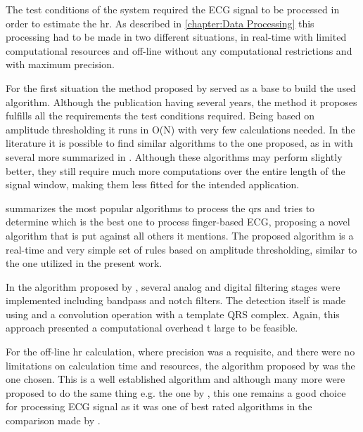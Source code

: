 The test conditions of the system required the ECG signal to be processed in order to estimate the \ac{hr}. As described in \cref{chapter:Data Processing} this processing had to be made in two different situations, in real-time with limited computational resources and off-line without any computational restrictions and with maximum precision.

For the first situation the method proposed by \citet{segmenter} served as a base to build the used algorithm. Although the publication having several years, the method it proposes fulfills all the requirements the test conditions required. Being based on amplitude thresholding it runs in O(N) \cite{big_o} with very few calculations needed. In the literature it is possible to find similar algorithms to the one proposed, as in \citet{b_segmenter, b_segmenter_2, b_segmenter_3} with several more summarized in \citet{b_segmenter_revisiting}. Although these algorithms may perform slightly better, they still require much more computations over the entire length of the signal window, making them less fitted for the intended application.

\citet{b_segmenter} summarizes the most popular algorithms to process the \ac{qrs} and tries to determine which is the best one to process finger-based ECG, proposing a novel algorithm that is put against all others it mentions. The proposed algorithm is a real-time and very simple set of rules based on amplitude thresholding, similar to the one utilized in the present work.

In the algorithm proposed by \citet{b_segmenter_2}, several analog and digital filtering stages were implemented including bandpass and notch filters. The detection itself is made using and a convolution operation with a template QRS complex. Again, this approach presented a computational overhead t large to be feasible.

For the off-line \ac{hr} calculation, where precision was a requisite, and there were no limitations on calculation time and resources, the algorithm proposed by \citet{engzee} was the one chosen. This is a well established algorithm and although many more were proposed to do the same thing  e.g. the one by \citet{b_segmenter_revisiting}, this one remains a good choice for processing ECG signal as it was one of best rated algorithms in the comparison made by \citet{b_segmenter_engzee_comparison}.

